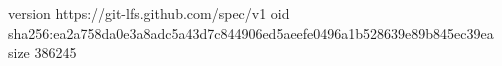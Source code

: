 version https://git-lfs.github.com/spec/v1
oid sha256:ea2a758da0e3a8adc5a43d7c844906ed5aeefe0496a1b528639e89b845ec39ea
size 386245
